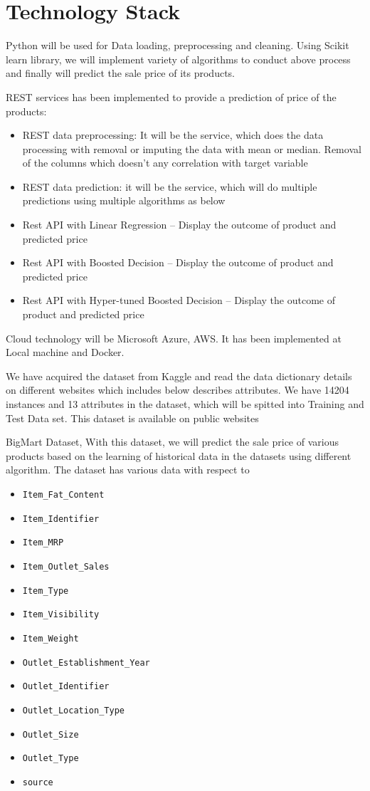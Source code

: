 \section{Technology Stack}

Python will be used for Data loading, preprocessing and cleaning. Using Scikit learn 
library, we will implement variety of algorithms to conduct above process and finally 
will predict the sale price of its products.

REST services has been implemented to provide a prediction of price of the 
products:

\begin{itemize}
	\item REST data preprocessing: It will be the service, which does the data processing 
	with removal or imputing the data with mean or median. Removal of the columns which 
	doesn’t any correlation with target variable
	\item REST data prediction: it will be the service, which will do multiple predictions 
	using multiple algorithms as below
	
	\item Rest API with Linear Regression – Display the outcome of product and predicted 
	price
	\item Rest API with Boosted Decision – Display the outcome of product and predicted price
	\item Rest API with Hyper-tuned Boosted Decision – Display the outcome of product and predicted price
\end{itemize}

Cloud technology will be Microsoft Azure, AWS. It has been implemented at Local machine and Docker.

We have acquired the dataset from Kaggle and read the data dictionary details on 
different websites which includes below describes attributes. We have 14204 instances and 13 
attributes in the dataset, which will be spitted into Training and Test Data set. This dataset 
is available on public websites

BigMart Dataset, With this dataset, we will predict the sale price of various products based 
on the learning of historical data in the datasets using different algorithm. The dataset has 
various data with respect to
\begin{itemize}
\item \verb|Item_Fat_Content|
\item \verb|Item_Identifier|
\item \verb|Item_MRP|
\item \verb|Item_Outlet_Sales|
\item \verb|Item_Type|
\item \verb|Item_Visibility|
\item \verb|Item_Weight|
\item \verb|Outlet_Establishment_Year|
\item \verb|Outlet_Identifier|
\item \verb|Outlet_Location_Type|
\item \verb|Outlet_Size|
\item \verb|Outlet_Type|
\item \verb|source|
\end{itemize}
~\cite{kaggleds}

